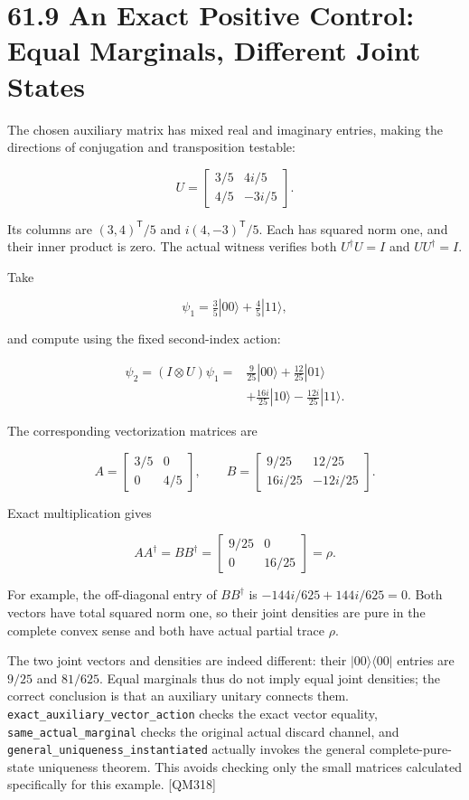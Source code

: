 \documentclass[
  11pt,
  oneside]{book}
\begin{document}
\section{61.9 An Exact Positive Control: Equal Marginals, Different
Joint States}

The chosen auxiliary matrix has mixed real and imaginary entries, making
the directions of conjugation and transposition testable:

\[
U=\begin{bmatrix}3/5&4i/5\\4/5&-3i/5\end{bmatrix}.
\]

Its columns are \((3,4)^\mathsf T/5\) and \(i(4,-3)^\mathsf T/5\). Each
has squared norm one, and their inner product is zero. The actual
witness verifies both \(U^\dagger U=I\) and \(UU^\dagger=I\).

Take

\[
\psi_1=\tfrac35|00\rangle+\tfrac45|11\rangle,
\]

and compute using the fixed second-index action:

\[
\begin{aligned}
\psi_2=(I\otimes U)\psi_1
={}&\tfrac9{25}|00\rangle+\tfrac{12}{25}|01\rangle\\
&+\tfrac{16i}{25}|10\rangle-\tfrac{12i}{25}|11\rangle.
\end{aligned}
\]

The corresponding vectorization matrices are

\[
A=\begin{bmatrix}3/5&0\\0&4/5\end{bmatrix},
\qquad
B=\begin{bmatrix}9/25&12/25\\16i/25&-12i/25\end{bmatrix}.
\]

Exact multiplication gives

\[
AA^\dagger=BB^\dagger
=\begin{bmatrix}9/25&0\\0&16/25\end{bmatrix}=\rho.
\]

For example, the off-diagonal entry of \(BB^\dagger\) is
\(-144i/625+144i/625=0\). Both vectors have total squared norm one, so
their joint densities are pure in the complete convex sense and both
have actual partial trace \(\rho\).

The two joint vectors and densities are indeed different: their
\(|00\rangle\langle00|\) entries are \(9/25\) and \(81/625\). Equal
marginals thus do not imply equal joint densities; the correct
conclusion is that an auxiliary unitary connects them.
\texttt{exact\_\allowbreak auxiliary\_\allowbreak vector\_\allowbreak action} checks the exact vector
equality, \texttt{same\_\allowbreak actual\_\allowbreak marginal} checks the original actual
discard channel, and \texttt{general\_\allowbreak uniqueness\_\allowbreak instantiated} actually
invokes the general complete-pure-state uniqueness theorem. This avoids
checking only the small matrices calculated specifically for this
example. {[}QM318{]}
\end{document}
